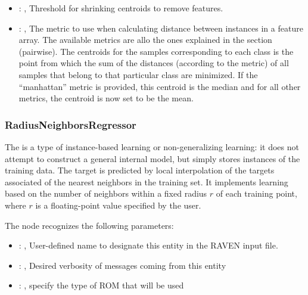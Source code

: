 \begin{itemize}
    \item {}: , 
      Threshold for shrinking centroids to remove features.

    \item {}: , 
      The metric to use when calculating distance between instances in a feature array.
      The available metrics are allo the ones explained in the  section (pairwise).
      The centroids for the samples corresponding to each class is the point from which the sum of
      the distances (according to the metric) of all samples that belong to that particular class
      are                                                  minimized. If the ``manhattan'' metric is
      provided, this centroid is the median and for all other metrics,
      the centroid is now set to be the mean.
  \end{itemize}


\subsubsection{RadiusNeighborsRegressor}
  The  is a type of instance-based learning or
  non-generalizing learning: it does not attempt to construct a general internal
  model, but simply stores instances of the training data.                          The target is
  predicted by local interpolation of the targets associated of the                          nearest
  neighbors in the training set.                          It implements learning based on the number
  of neighbors within a fixed radius                          $r$ of each training point, where $r$
  is a floating-point value specified by the                          user.

  The  node recognizes the following parameters:
    \begin{itemize}
      \item {}: , 
        User-defined name to designate this entity in the RAVEN input file.
      \item {}: , 
        Desired verbosity of messages coming from this entity
      \item {}: , 
        specify the type of ROM that will be used
  \end{itemize}

